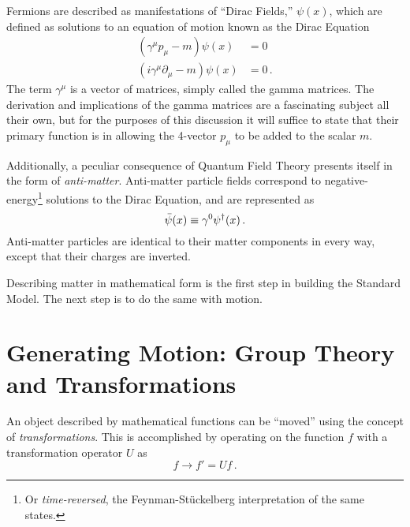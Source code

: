     Fermions are described as manifestations of ``Dirac Fields,'' $\psi(x)$,
        which are defined as solutions to an equation of motion known as the Dirac Equation
    \begin{equation} \begin{split}
        (\gamma^\mu p_\mu - m) \psi(x) &= 0 \\
        (i\gamma^\mu \partial_\mu - m) \psi(x) &= 0
        \,.
    \end{split} \end{equation}
    The term $\gamma^\mu$ is a vector of matrices, simply called the gamma matrices.
    The derivation and implications of the gamma matrices are a fascinating subject all their own, 
        but for the purposes of this discussion it will suffice to state that
        their primary function is in allowing the 4-vector $p_\mu$ to be added to the scalar $m$.

    Additionally, a peculiar consequence of Quantum Field Theory presents itself in the form of \textit{anti-matter}.
    Anti-matter particle fields correspond to negative-energy\footnote{
            Or \textit{time-reversed}, the Feynman-St\"uckelberg interpretation of the same states.
        } solutions to the Dirac Equation,
        and are represented as
    \begin{equation}
        \bar{\psi}(x) \equiv \gamma^0 \psi^\dag(x)
        \,.
    \end{equation}
    Anti-matter particles are identical to their matter components in every way,
        except that their charges are inverted.

    Describing matter in mathematical form is the first step in building the Standard Model.
    The next step is to do the same with motion.


\section{Generating Motion: Group Theory and Transformations} \label{sec:group_theory}

    An object described by mathematical functions can be ``moved'' using the concept of \textit{transformations}.
    This is accomplished by operating on the function $f$ with a transformation operator $U$ as
    \begin{equation}
        f \to f' = U f
        \,.
    \end{equation}

